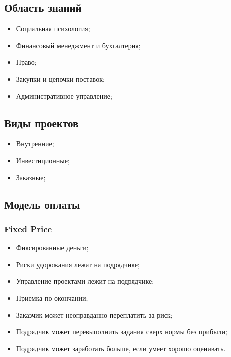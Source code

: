 \documentclass[a4paper,8pt]{article}
\begin{document}
\subsection{Область знаний}

    \begin{itemize}
        \item Социальная психология;
        \item Финансовый менеджмент и бухгалтерия;
        \item Право;
        \item Закупки и цепочки поставок;
        \item Административное управление;
    \end{itemize}



\subsection{Виды проектов}


    \begin{itemize}
        \item Внутренние;
        \item Инвестиционные;
        \item Заказные;
    \end{itemize}


\subsection{Модель оплаты}

\subsubsection{Fixed Price}

    \begin{itemize}
        \item Фиксированные деньги;
        \item Риски удорожания лежат на подрядчике;
        \item Управление проектами лежит на подрядчике;
        \item Приемка по окончании;
        \item Заказчик может неоправданно переплатить за риск;
        \item Подрядчик может перевыполнить задания сверх нормы без прибыли;
        \item Подрядчик может заработать больше, если умеет хорошо оценивать.
    \end{itemize}
\end{document}
